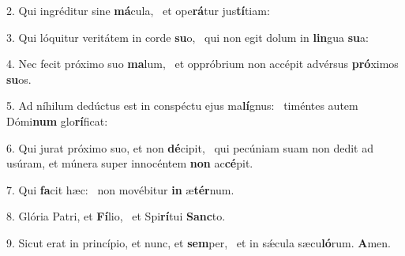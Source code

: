 2. Qui ingréditur sine \textbf{má}cula, \ast\  et ope\textbf{rá}tur jus\textbf{tí}tiam:\

3. Qui lóquitur veritátem in corde \textbf{su}o, \ast\  qui non egit dolum in \textbf{lin}gua \textbf{su}a:\

4. Nec fecit próximo suo \textbf{ma}lum, \ast\  et oppróbrium non accépit advérsus \textbf{pró}ximos \textbf{su}os.\

5. Ad níhilum dedúctus est in conspéctu ejus ma\textbf{lí}gnus: \ast\  timéntes autem Dómi\textbf{num} glo\textbf{rí}ficat:\

6. Qui jurat próximo suo, et non \textbf{dé}cipit, \ast\  qui pecúniam suam non dedit ad usúram, et múnera super innocéntem \textbf{non} ac\textbf{cé}pit.\

7. Qui \textbf{fa}cit hæc: \ast\  non movébitur \textbf{in} æ\textbf{tér}num.\

8. Glória Patri, et \textbf{Fí}lio, \ast\  et Spi\textbf{rí}tui \textbf{Sanc}to.\

9. Sicut erat in princípio, et nunc, et \textbf{sem}per, \ast\  et in sǽcula sæcu\textbf{ló}rum. \textbf{A}men.\

